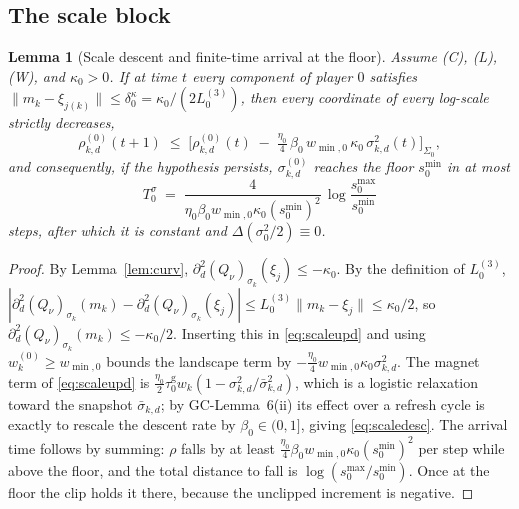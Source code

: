 \documentclass[11pt]{article}
\newtheorem{lemma}{Lemma}
\theoremstyle{definition}
\newcommand{\GC}[1]{\textsf{GC-#1}}
\begin{document}
\subsection{The scale block}

\begin{lemma}[Scale descent and finite-time arrival at the floor]
\label{lem:scale}
Assume (C), (L), (W), and $\kappa_0 > 0$. If at time $t$ every component of
player $0$ satisfies $\|m_k - \xi_{j(k)}\| \le \delta^\kappa_0 =
\kappa_0/(2L^{(3)}_0)$, then every coordinate of every log-scale strictly
decreases,
\begin{equation}\label{eq:scaledesc}
  \rho^{(0)}_{k,d}(t+1) \;\le\; \Big[\rho^{(0)}_{k,d}(t)
  \;-\; \tfrac{\eta_0}{4}\,\beta_0\, w_{\min,0}\, \kappa_0\, \sigma_{k,d}^2(t)
  \Big]_{\Sigma_0} ,
\end{equation}
and consequently, if the hypothesis persists, $\sigma^{(0)}_{k,d}$ reaches the
floor $s^{\min}_0$ in at most
\[
  T^\sigma_0 \;=\; \frac{4}{\eta_0\beta_0 w_{\min,0}\kappa_0 (s^{\min}_0)^2}
  \, \log\frac{s^{\max}_0}{s^{\min}_0}
\]
steps, after which it is constant and $\Delta(\sigma_0^2/2) \equiv 0$.
\end{lemma}

\begin{proof}
By Lemma~\ref{lem:curv}, $\partial_d^2 (Q_\nu)_{\sigma_k}(\xi_j) \le -\kappa_0$.
By the definition of $L^{(3)}_0$, $|\partial_d^2 (Q_\nu)_{\sigma_k}(m_k) -
\partial_d^2 (Q_\nu)_{\sigma_k}(\xi_j)| \le L^{(3)}_0\|m_k - \xi_j\| \le
\kappa_0/2$, so $\partial_d^2 (Q_\nu)_{\sigma_k}(m_k) \le -\kappa_0/2$. Inserting
this in \eqref{eq:scaleupd} and using $w^{(0)}_k \ge w_{\min,0}$ bounds the
landscape term by $-\tfrac{\eta_0}{4} w_{\min,0}\kappa_0\sigma_{k,d}^2$. The
magnet term of \eqref{eq:scaleupd} is $\tfrac{\eta_0}{2}\tau^{\mathrm g}_0
w_k(1 - \sigma_{k,d}^2/\bar\sigma_{k,d}^2)$, which is a logistic relaxation
toward the snapshot $\bar\sigma_{k,d}$; by \GC{Lemma~6}(ii) its effect over a
refresh cycle is exactly to rescale the descent rate by
$\beta_0 \in (0,1]$, giving \eqref{eq:scaledesc}. The arrival time follows by
summing: $\rho$ falls by at least $\tfrac{\eta_0}{4}\beta_0 w_{\min,0}\kappa_0
(s^{\min}_0)^2$ per step while above the floor, and the total distance to fall is
$\log(s^{\max}_0/s^{\min}_0)$. Once at the floor the clip holds it there, because
the unclipped increment is negative.
\end{proof}
\end{document}
